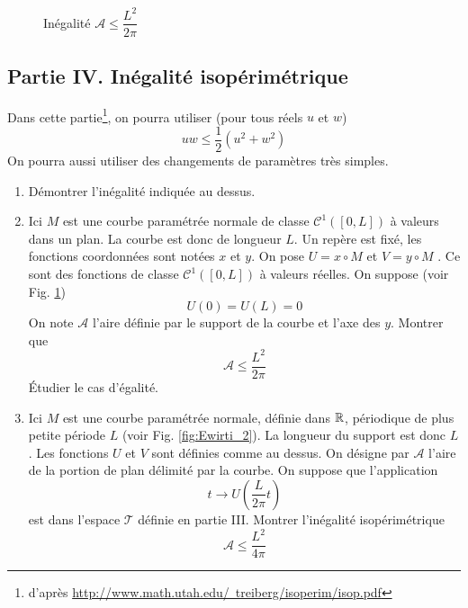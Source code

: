 \begin{figure}[ht]
 \centering
 
 \caption{Inégalité $\mathcal A \leq \dfrac{L^2}{2\pi}$}
 \label{fig:Ewirti_1}
\end{figure}

\subsection*{Partie IV. Inégalité isopérimétrique}
Dans cette partie\footnote{d'après \href{http://www.math.utah.edu/~treiberg/isoperim/isop.pdf}{http://www.math.utah.edu/~treiberg/isoperim/isop.pdf}}, on pourra utiliser (pour tous réels $u$ et $w$)
\begin{displaymath}
 uw\leq \dfrac{1}{2}(u^2+w^2)
\end{displaymath}
On pourra aussi utiliser des changements de paramètres très simples.
\begin{enumerate}
 \item Démontrer l'inégalité indiquée au dessus.
\item Ici $M$ est une courbe paramétrée normale de classe $\mathcal C^1([0,L])$ à valeurs dans un plan. La courbe est donc de longueur $L$. Un repère est fixé, les fonctions coordonnées sont notées $x$ et $y$. On pose $U=x\circ M$ et $V=y\circ M$ . Ce sont des fonctions de classe $\mathcal C^1([0,L])$ à valeurs réelles. On suppose (voir Fig. \ref{fig:Ewirti_1})
\begin{displaymath}
 U(0)=U(L)=0
\end{displaymath}
On note $\mathcal A$ l'aire définie par le support de la courbe et l'axe des $y$. Montrer que 
\begin{displaymath}
 \mathcal A \leq \dfrac{L^2}{2\pi}
\end{displaymath}
\'Etudier le cas d'égalité.
\item Ici $M$ est une courbe paramétrée normale, définie dans $\mathbb{R}$, périodique de plus petite période $L$ (voir Fig. \ref{fig:Ewirti_2}). La longueur du support est donc $L$. Les fonctions $U$ et $V$ sont définies comme au dessus. On désigne par $\mathcal A$ l'aire de la portion de plan délimité par la courbe. On suppose que l'application
\begin{displaymath}
 t \rightarrow U(\dfrac{L}{2\pi}t)
\end{displaymath}
est dans l'espace $\mathcal T$ définie en partie III. Montrer l'inégalité isopérimétrique
\begin{displaymath}
 \mathcal A \leq \dfrac{L^2}{4\pi}
\end{displaymath}
\end{enumerate}
\clearpage
